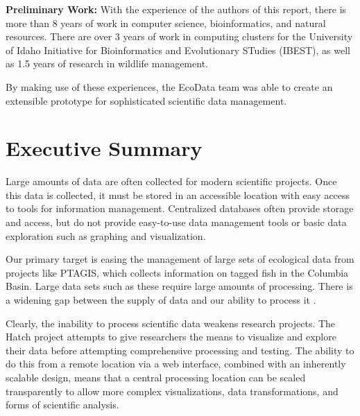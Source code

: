 \documentclass[12pt,letterpaper]{scrartcl}
\begin{document}
\textbf{Preliminary Work:} With the experience of the authors of this report, there is more than 8 
years of work in computer science, bioinformatics, and natural resources. There are over 3 years of 
work in computing clusters for the University of Idaho Initiative for Bioinformatics and 
Evolutionary STudies (IBEST), as well as 1.5 years of research in wildlife management.

By making use of these experiences, the EcoData team was able to create an extensible prototype for 
sophisticated scientific data management.

\thispagestyle{empty}

\pagebreak

\maketitle

\thispagestyle{empty}

\pagebreak

\thispagestyle{empty}
\tableofcontents
\listoffigures

\pagebreak

\doublespacing

\section{Executive Summary}
Large amounts of data are often collected for modern scientific projects.  Once this data is 
collected, it must be stored in an accessible location with easy access to tools for information 
management.  Centralized databases often provide storage and access, but do not provide easy-to-use 
data management tools or basic data exploration such as graphing and visualization.

Our primary target is easing the management of large sets of ecological data from projects like 
PTAGIS, which collects information on tagged fish in the Columbia Basin.  Large data sets such as
these require large amounts of processing.  There is a widening gap between the supply of data
and our ability to process it \cite{gordon_moore}.

Clearly, the inability to process scientific data weakens research projects.  The Hatch project
attempts to give researchers the means to visualize and explore their data before attempting
comprehensive processing and testing.  The ability to do this from a remote location via a
web interface, combined with an inherently scalable design, means that a central processing location 
can be scaled transparently to allow more complex visualizations, data transformations, and
forms of scientific analysis.
\end{document}
